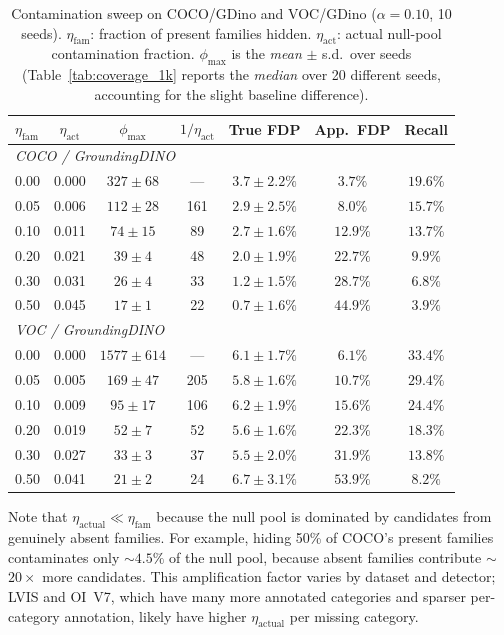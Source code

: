 \documentclass{article}
\theoremstyle{remark}
\newcommand{\1}{\mathbf{1}}
\begin{document}
\begin{table}[h]
\centering
\small
\caption{Contamination sweep on COCO/GDino and VOC/GDino ($\alpha=0.10$,
10 seeds). $\eta_{\mathrm{fam}}$: fraction of present families hidden.
$\eta_{\mathrm{act}}$: actual null-pool contamination fraction.
$\phi_{\max}$ is the \emph{mean} $\pm$ s.d.\ over seeds (Table~\ref{tab:coverage_1k}
reports the \emph{median} over 20 different seeds, accounting for the
slight baseline difference).}
\label{tab:contamination_detail}
\begin{tabular*}{\linewidth}{@{\extracolsep{\fill}}lcccccc@{}}
\toprule
$\eta_{\mathrm{fam}}$ & $\eta_{\mathrm{act}}$ & $\phi_{\max}$ & $1/\eta_{\mathrm{act}}$ & True FDP & App.\ FDP & Recall \\
\midrule
\multicolumn{7}{l}{\emph{COCO / GroundingDINO}} \\
0.00 & 0.000 & $327\pm68$ & --- & $3.7\pm2.2\%$ & $3.7\%$ & $19.6\%$ \\
0.05 & 0.006 & $112\pm28$ & 161 & $2.9\pm2.5\%$ & $8.0\%$ & $15.7\%$ \\
0.10 & 0.011 & $74\pm15$ & 89 & $2.7\pm1.6\%$ & $12.9\%$ & $13.7\%$ \\
0.20 & 0.021 & $39\pm4$ & 48 & $2.0\pm1.9\%$ & $22.7\%$ & $9.9\%$ \\
0.30 & 0.031 & $26\pm4$ & 33 & $1.2\pm1.5\%$ & $28.7\%$ & $6.8\%$ \\
0.50 & 0.045 & $17\pm1$ & 22 & $0.7\pm1.6\%$ & $44.9\%$ & $3.9\%$ \\
\midrule
\multicolumn{7}{l}{\emph{VOC / GroundingDINO}} \\
0.00 & 0.000 & $1577\pm614$ & --- & $6.1\pm1.7\%$ & $6.1\%$ & $33.4\%$ \\
0.05 & 0.005 & $169\pm47$ & 205 & $5.8\pm1.6\%$ & $10.7\%$ & $29.4\%$ \\
0.10 & 0.009 & $95\pm17$ & 106 & $6.2\pm1.9\%$ & $15.6\%$ & $24.4\%$ \\
0.20 & 0.019 & $52\pm7$ & 52 & $5.6\pm1.6\%$ & $22.3\%$ & $18.3\%$ \\
0.30 & 0.027 & $33\pm3$ & 37 & $5.5\pm2.0\%$ & $31.9\%$ & $13.8\%$ \\
0.50 & 0.041 & $21\pm2$ & 24 & $6.7\pm3.1\%$ & $53.9\%$ & $8.2\%$ \\
\bottomrule
\end{tabular*}
\end{table}

Note that $\eta_{\mathrm{actual}} \ll \eta_{\mathrm{fam}}$ because the null
pool is dominated by candidates from genuinely absent families. For example,
hiding 50\% of COCO's present families contaminates only $\sim$$4.5\%$ of the null
pool, because absent families contribute $\sim$$20\times$ more candidates.
This amplification factor varies by dataset and detector; LVIS and OI~V7, which
have many more annotated categories and sparser per-category annotation, likely
have higher $\eta_{\mathrm{actual}}$ per missing category.
\end{document}
